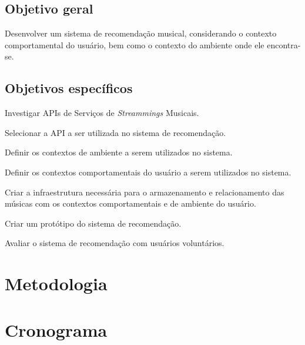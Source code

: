 \documentclass{article}
\begin{document}
\subsection{Objetivo geral}

Desenvolver um sistema de recomendação musical, considerando o contexto comportamental do usuário, bem como o contexto do ambiente onde ele encontra-se.

\subsection{Objetivos específicos}

\begin{itemize}
\item Investigar APIs de Serviços de \textit{Streammings} Musicais.

\item Selecionar a API a ser utilizada no sistema de recomendação.

{\color{red} \item Definir os contextos de ambiente a serem utilizados no sistema.

\item Definir os contextos comportamentais do usuário a serem utilizados no sistema.}

\item Criar a infraestrutura necessária para o armazenamento e relacionamento das músicas com os contextos comportamentais e de ambiente do usuário.

{\color{red} \item Criar um protótipo do sistema de recomendação.}

\item Avaliar o sistema de recomendação com usuários voluntários.

\end{itemize}

\newpage

\section{Metodologia}

\newpage

\section{Cronograma}

\newpage


% 

\end{document}
